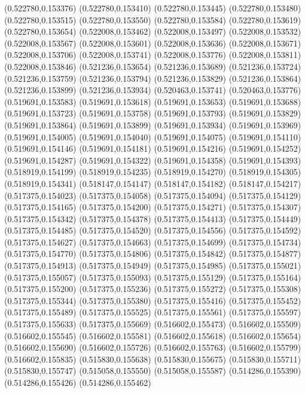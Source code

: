 (0.522780,0.153376)
(0.522780,0.153410)
(0.522780,0.153445)
(0.522780,0.153480)
(0.522780,0.153515)
(0.522780,0.153550)
(0.522780,0.153584)
(0.522780,0.153619)
(0.522780,0.153654)
(0.522008,0.153462)
(0.522008,0.153497)
(0.522008,0.153532)
(0.522008,0.153567)
(0.522008,0.153601)
(0.522008,0.153636)
(0.522008,0.153671)
(0.522008,0.153706)
(0.522008,0.153741)
(0.522008,0.153776)
(0.522008,0.153811)
(0.522008,0.153846)
(0.521236,0.153654)
(0.521236,0.153689)
(0.521236,0.153724)
(0.521236,0.153759)
(0.521236,0.153794)
(0.521236,0.153829)
(0.521236,0.153864)
(0.521236,0.153899)
(0.521236,0.153934)
(0.520463,0.153741)
(0.520463,0.153776)
(0.519691,0.153583)
(0.519691,0.153618)
(0.519691,0.153653)
(0.519691,0.153688)
(0.519691,0.153723)
(0.519691,0.153758)
(0.519691,0.153793)
(0.519691,0.153829)
(0.519691,0.153864)
(0.519691,0.153899)
(0.519691,0.153934)
(0.519691,0.153969)
(0.519691,0.154005)
(0.519691,0.154040)
(0.519691,0.154075)
(0.519691,0.154110)
(0.519691,0.154146)
(0.519691,0.154181)
(0.519691,0.154216)
(0.519691,0.154252)
(0.519691,0.154287)
(0.519691,0.154322)
(0.519691,0.154358)
(0.519691,0.154393)
(0.518919,0.154199)
(0.518919,0.154235)
(0.518919,0.154270)
(0.518919,0.154305)
(0.518919,0.154341)
(0.518147,0.154147)
(0.518147,0.154182)
(0.518147,0.154217)
(0.517375,0.154023)
(0.517375,0.154058)
(0.517375,0.154094)
(0.517375,0.154129)
(0.517375,0.154165)
(0.517375,0.154200)
(0.517375,0.154271)
(0.517375,0.154307)
(0.517375,0.154342)
(0.517375,0.154378)
(0.517375,0.154413)
(0.517375,0.154449)
(0.517375,0.154485)
(0.517375,0.154520)
(0.517375,0.154556)
(0.517375,0.154592)
(0.517375,0.154627)
(0.517375,0.154663)
(0.517375,0.154699)
(0.517375,0.154734)
(0.517375,0.154770)
(0.517375,0.154806)
(0.517375,0.154842)
(0.517375,0.154877)
(0.517375,0.154913)
(0.517375,0.154949)
(0.517375,0.154985)
(0.517375,0.155021)
(0.517375,0.155057)
(0.517375,0.155093)
(0.517375,0.155129)
(0.517375,0.155164)
(0.517375,0.155200)
(0.517375,0.155236)
(0.517375,0.155272)
(0.517375,0.155308)
(0.517375,0.155344)
(0.517375,0.155380)
(0.517375,0.155416)
(0.517375,0.155452)
(0.517375,0.155489)
(0.517375,0.155525)
(0.517375,0.155561)
(0.517375,0.155597)
(0.517375,0.155633)
(0.517375,0.155669)
(0.516602,0.155473)
(0.516602,0.155509)
(0.516602,0.155545)
(0.516602,0.155581)
(0.516602,0.155618)
(0.516602,0.155654)
(0.516602,0.155690)
(0.516602,0.155726)
(0.516602,0.155763)
(0.516602,0.155799)
(0.516602,0.155835)
(0.515830,0.155638)
(0.515830,0.155675)
(0.515830,0.155711)
(0.515830,0.155747)
(0.515058,0.155550)
(0.515058,0.155587)
(0.514286,0.155390)
(0.514286,0.155426)
(0.514286,0.155462)
